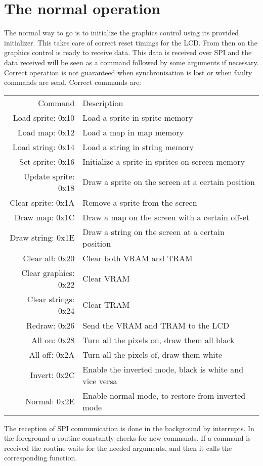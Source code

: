 \section{The normal operation}
	\par The normal way to go is to initialize the graphics control using its provided initializer. This takes care of correct reset timings for the LCD. From then on the graphics control is ready to receive data. This data is received over SPI and the data received will be seen as a command followed by some arguments if necessary. Correct operation is not guaranteed when synchronisation is lost or when faulty commands are send. Correct commands are:
	\begin{tabular}{r|l}
		Command & Description \\
		Load sprite: 0x10 & Load a sprite in sprite memory \\
		Load map: 0x12 & Load a map in map memory \\
		Load string: 0x14 & Load a string in string memory \\
		Set sprite: 0x16 & Initialize a sprite in sprites on screen memory \\
		Update sprite: 0x18 & Draw a sprite on the screen at a certain position \\
		Clear sprite: 0x1A & Remove a sprite from the screen \\
		Draw map: 0x1C & Draw a map on the screen with a certain offset \\
		Draw string: 0x1E & Draw a string on the screen at a certain position \\
		Clear all: 0x20 & Clear both VRAM and TRAM \\
		Clear graphics: 0x22 & Clear VRAM \\
		Clear strings: 0x24 & Clear TRAM \\
		Redraw: 0x26 & Send the VRAM and TRAM to the LCD \\
		All on: 0x28 & Turn all the pixels on, draw them all black \\
		All off: 0x2A &  Turn all the pixels of, draw them white\\
		Invert: 0x2C &  Enable the inverted mode, black is white and vice versa\\
		Normal: 0x2E &  Enable normal mode, to restore from inverted mode\\
	\end{tabular}
	The reception of SPI communication is done in the background by interrupts. In the foreground a routine constantly checks for new commands. If a command is received the routine waits for the needed arguments, and then it calls the corresponding function.



